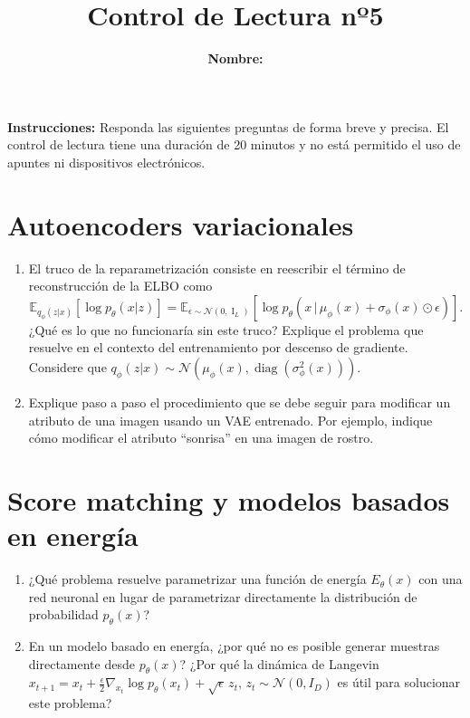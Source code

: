 \documentclass{article}
\title{\bfseries{Control de Lectura nº5}\vspace{0.5cm}}
\author{\textbf{Nombre:} \rule{12cm}{0.4pt}}
\begin{document}
\maketitle

\hspace{-0.5cm}\textbf{Instrucciones:} Responda las siguientes preguntas de forma breve y precisa. El control de lectura tiene una duración de 20 minutos y no está permitido el uso de apuntes ni dispositivos electrónicos.

\section*{Autoencoders variacionales}
\begin{enumerate}[{\bf P1.}]
	\item El truco de la reparametrización consiste en reescribir el término de reconstrucción de la ELBO como
	\begin{equation*}
		\mathbb{E}_{q_\phi(z|x)}\!\left[\log p_\theta(x|z)\right]
		= \mathbb{E}_{\epsilon\sim\mathcal{N}(0,\operatorname{I}_L)}\!\left[\log p_\theta\!\left(x\,\big|\,\mu_\phi(x)+\sigma_\phi(x)\odot\epsilon\right)\right].
	\end{equation*}
	¿Qué es lo que no funcionaría sin este truco? Explique el problema que resuelve en el contexto del entrenamiento por descenso de gradiente. Considere que $q_\phi(z|x)\sim \mathcal{N}(\mu_\phi(x),\operatorname{diag}(\sigma_\phi^2(x)))$.

	\item Explique paso a paso el procedimiento que se debe seguir para modificar un atributo de una imagen usando un VAE entrenado. Por ejemplo, indique cómo modificar el atributo ``sonrisa'' en una imagen de rostro.
\end{enumerate}

\section*{Score matching y modelos basados en energía}
\begin{enumerate}[{\bf P1.}]
	\item ¿Qué problema resuelve parametrizar una función de energía $E_\theta(x)$ con una red neuronal en lugar de parametrizar directamente la distribución de probabilidad $p_\theta(x)$?

	\item En un modelo basado en energía, ¿por qué no es posible generar muestras directamente desde $p_\theta(x)$? ¿Por qué la dinámica de Langevin $x_{t+1} = x_t + \frac{\epsilon}{2} \nabla_{x_t} \log p_\theta(x_t) + \sqrt{\epsilon}\, z_t,\,z_t\sim \mathcal{N}(0,I_D)$ es útil para solucionar este problema?
\end{enumerate}
\end{document}
